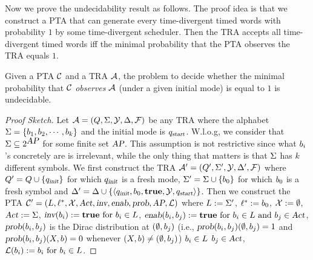 Now we prove the undecidability result as follows.
The proof idea is that we construct a PTA that can generate every time-divergent timed words with probability $1$ by some time-divergent scheduler.
Then the TRA accepts all time-divergent timed words iff the minimal probability that the PTA observes the TRA equals $1$.
%
\begin{theorem}\label{thm:traundecidability}
Given a PTA $\mathcal{C}$ and a TRA $\mathcal{A}$, the problem to decide whether the minimal probability
that $\mathcal{C}$ \emph{observes} $\mathcal{A}$ (under a given initial mode) is equal to $1$ is undecidable.
\end{theorem}
%
\begin{proof}[Proof Sketch]
Let $\mathcal{A}=(Q,\Sigma,\mathcal{Y},\Delta,\mathcal{F})$ be any TRA where the alphabet $\Sigma = \{b_{1}, b_{2}, \cdots, b_{k}\}$ and the initial mode is $q_{\mbox{\sl\scriptsize start}}$.
W.l.o.g, we consider that $\Sigma\subseteq 2^{\mbox{\sl AP}}$ for some finite set $\mbox{\sl AP}$.
This assumption is not restrictive since what $b_{i}$'s concretely are is irrelevant, while the only thing that matters is that $\Sigma$ has $k$ different symbols.
We first construct the TRA $\mathcal{A}' = (Q', \Sigma', \mathcal{Y}, \Delta',\mathcal{F})$ where
$Q'   = Q  \cup \{ q_{\mbox{\sl\scriptsize init} } \}$ for which $q_{\mbox{\sl\scriptsize init} }$ is a fresh mode,
$\Sigma'  = \Sigma \cup \{ b_{0} \}$ for which $b_{0}$ is a fresh symbol and 
$\Delta'     = \Delta    \cup \{ \langle
            q_{\mbox{\sl\scriptsize init} },
            b_{0},
            \mathbf{true},
            \mathcal{Y},
            q_{\mbox{\sl\scriptsize start}}
        \rangle
    \}$.
Then we construct the PTA
$
\mathcal{C}'=\left(L, \ell^*, \mathcal{X}, \mbox{\sl Act}, \mbox{\sl inv}, \mbox{\sl enab},  \mbox{\sl prob}, \mbox{\sl AP}, \mathcal{L}\right)
$
where
$L :=  \Sigma'$,
$\ell^* :=  b_{0} $, 
$\mathcal{X} :=  \emptyset $, 
$\mbox{\sl Act} := \Sigma $,
$\mbox{\sl inv}(b_{i})            :=  \mathbf{true}
                                \text{ for }
                                b_{i} \in L$,
$\mbox{\sl enab}(b_{i},b_{j}) :=  \mathbf{true}
                                \text{ for }
                                b_{i} \in L
                                \text{ and }
                                b_{j} \in \mbox{\sl Act}$,
$\mbox{\sl prob}(b_{i},b_{j})$ is the Dirac distribution at $(\emptyset,b_{j})$ (i.e., $\mbox{\sl prob}(b_{i},b_{j})(\emptyset,b_{j})=1$ and $\mbox{\sl prob}(b_{i},b_{j})(X,b)=0$ whenever $(X,b)\ne(\emptyset,b_{j})$)  $b_{i} \in L$  $b_{j} \in \mbox{\sl Act}$,
$\mathcal{L}(b_{i})         :=  b_{i}
                                \text{ for } b_{i} \in L$.


\end{proof}
